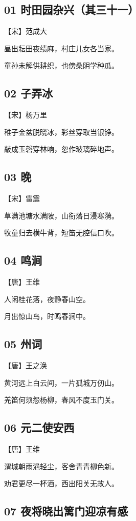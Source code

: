 \documentclass[a6paper, 12pt]{article}
\begin{document}
\subsection*{01 时田园杂兴（其三十一）}

【宋】范成大

昼出耘田夜绩麻，村庄儿女各当家。

童孙未解供耕织，也傍桑阴学种瓜。

\subsection*{02 子弄冰}

【宋】杨万里

稚子金盆脱晓冰，彩丝穿取当银铮。

敲成玉磬穿林响，忽作玻璃碎地声。

\subsection*{03 晚}


【宋】雷震

草满池塘水满陂，山衔落日浸寒漪。

牧童归去横牛背，短笛无腔信口吹。

\subsection*{04 鸣涧}

【唐】王维

人闲桂花落，夜静春山空。

月出惊山鸟，时鸣春涧中。

\subsection*{05 州词}

【唐】王之涣

黄河远上白云间，一片孤城万仞山。

羌笛何须怨杨柳，春风不度玉门关。

\subsection*{06 元二使安西}

【唐】王维

渭城朝雨浥轻尘，客舍青青柳色新。

劝君更尽一杯酒，西出阳关无故人。

\subsection*{07 夜将晓出篱门迎凉有感}
\end{document}
